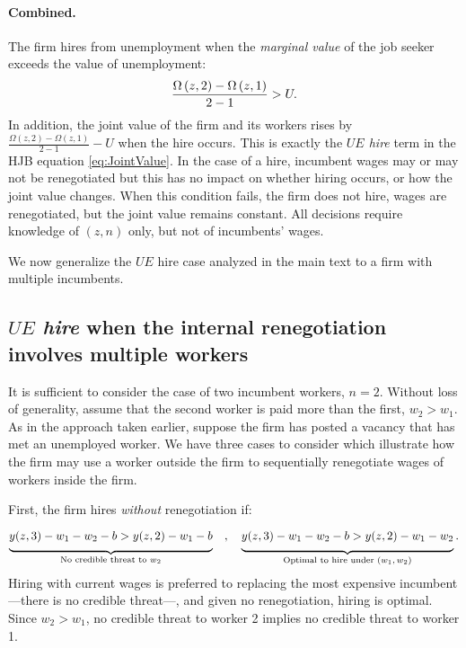 \vspace*{-.3cm}
\paragraph{Combined.}
The firm hires from unemployment when the \emph{marginal value} of the job seeker exceeds the value of unemployment:
\vspace*{-.3cm}\begin{equation}
\frac{\Omega \left( z,2\right) -\Omega \left( z,1\right)}{2-1} >U.
\vspace*{-.3cm}\end{equation}%
In addition, the joint value of the firm and its workers rises by $\frac{\Omega \left( z,2\right) -\Omega \left( z,1\right)}{2-1} - U$ when the hire occurs. This is exactly the \emph{$UE$ hire} term in the HJB equation \eqref{eq:JointValue}.
In the case of a hire, incumbent wages may or may not be renegotiated but this has no impact on whether hiring occurs, or how the joint value changes.
When this condition fails, the firm does not hire, wages are renegotiated, but the joint value remains constant.
All decisions require knowledge of $(z,n)$ only, but not of incumbents' wages.

We now generalize the $UE$ hire case analyzed in the main text to a firm with multiple incumbents.

\vspace*{-.2cm}\subsection{\emph{$UE$ hire} when the internal renegotiation involves multiple workers}
\label{appx:UE_hire_multiple}
It is sufficient to consider the case of two incumbent workers, $n=2$. Without loss of generality, assume that the second worker is paid more than the first, $w_{2}>w_{1}$. As in the approach taken earlier, suppose the firm has posted a vacancy that has met an unemployed worker.
We have three cases to consider which illustrate how the firm may use a worker outside the firm to sequentially renegotiate wages of workers inside the firm.

First, the firm hires \emph{without} renegotiation if:
\vspace*{-.3cm}\begin{equation*}
\underbrace{\Big.
y(z,3)-w_{1}-w_{2}-b > y(z,2)-w_{1}-b
\Big.}_{\text{No credible threat to $w_2$}}
\quad,\quad
\underbrace{\Big.
y(z,3)-w_{1}-w_{2}-b > y(z,2)-w_{1}-w_{2}
\Big.}_{\text{Optimal to hire under $(w_1,w_2)$}}.
\vspace*{-.3cm}\end{equation*}
Hiring with current wages is preferred to replacing the most expensive incumbent---there is no credible threat---, and given no renegotiation, hiring is optimal.
Since $w_2>w_1$, no credible threat to worker 2 implies no credible threat to worker 1.

